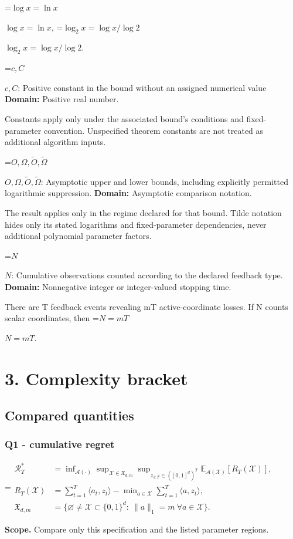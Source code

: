 \documentclass[10pt,a4paper]{article}
\newcommand{\AtlasMath}[1]{\par\begingroup\centering\setbox0=\hbox{$\displaystyle #1$}\ifdim\wd0>1.4\linewidth\typeout{ATLAS WIDE FORMULA: \the\wd0}\fi\ifdim\wd0>\linewidth\resizebox{\linewidth}{!}{\box0}\else\box0\fi\par\endgroup}
\newcommand{\AtlasInlineMath}[1]{\begingroup\setbox0=\hbox{$#1$}\ifdim\wd0>.4\linewidth\endgroup\AtlasMath{#1}\else\endgroup$#1$\fi}
\begin{document}
\AtlasInlineMath{\log x=\ln x}, \AtlasInlineMath{\log_2x=\log x/\log2}.

\AtlasInlineMath{c,C}: Positive constant in the bound without an assigned numerical value \textbf{Domain:} Positive real number.

Constants apply only under the associated bound’s conditions and fixed-parameter convention. Unspecified theorem constants are not treated as additional algorithm inputs.

\AtlasInlineMath{O,\Omega,\widetilde O,\widetilde\Omega}: Asymptotic upper and lower bounds, including explicitly permitted logarithmic suppression. \textbf{Domain:} Asymptotic comparison notation.

The result applies only in the regime declared for that bound. Tilde notation hides only its stated logarithms and fixed-parameter dependencies, never additional polynomial parameter factors.

\AtlasInlineMath{N}: Cumulative observations counted according to the declared feedback type. \textbf{Domain:} Nonnegative integer or integer-valued stopping time.

There are T feedback events revealing mT active-coordinate losses. If N counts scalar coordinates, then \AtlasInlineMath{N=mT}.

\section{3. Complexity bracket}
\subsection{Compared quantities}
\subsubsection{Q1 - cumulative regret}
\AtlasMath{\begin{aligned}\mathcal R_T^*&=\inf_{\mathcal A(\cdot)}\sup_{\mathcal X\in\mathfrak X_{d,m}}\sup_{z_{1:T}\in([0,1]^d)^T}\mathbb E_{\mathcal A(\mathcal X)}[R_T(\mathcal X)],\\ R_T(\mathcal X)&=\sum_{t=1}^T\langle a_t,z_t\rangle-\min_{a\in\mathcal X}\sum_{t=1}^T\langle a,z_t\rangle,\\ \mathfrak X_{d,m}&=\{\varnothing\ne\mathcal X\subset\{0,1\}^d:\ \|a\|_1=m\ \forall a\in\mathcal X\}.\end{aligned}}
\textbf{Scope.} Compare only this specification and the listed parameter regions.
\end{document}
